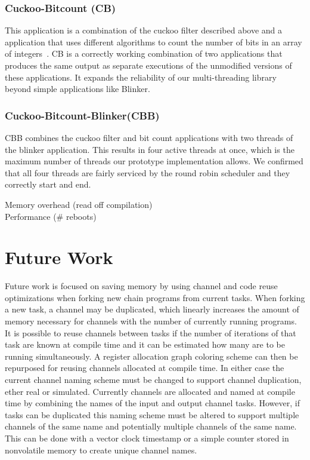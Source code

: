 \documentclass[11pt]{sensys-proc}
\begin{document}
\subsubsection{Cuckoo-Bitcount (CB)}
This application is a combination of the cuckoo filter described above and a
application that uses different algorithms to count the number of bits in an
array of integers~\cite{bitcount}. CB is a correctly working combination of two
applications that produces the same output as separate executions of the
unmodified versions of these applications. It expands the reliability of our
multi-threading library beyond simple applications like Blinker.
\subsubsection{Cuckoo-Bitcount-Blinker(CBB)}
CBB combines the cuckoo filter and bit count applications with two threads of
the blinker application. This results in four active threads at once, which is
the maximum number of threads our prototype implementation allows. We confirmed
that all four threads are fairly serviced by the round robin scheduler and they
correctly start and end. 


Memory overhead (read off compilation)\\
Performance (\# reboots)\\


\section{Future Work}
Future work is focused on saving memory by using channel and code reuse
optimizations when forking new chain programs from current tasks.  When forking
a new task, a channel may be duplicated, which linearly increases the amount of
memory necessary for channels with the number of currently running programs.  It
is possible to reuse channels between tasks if the number of iterations of that
task are known at compile time and it can be estimated how many are to be
running simultaneously. A register allocation graph coloring scheme can then be
repurposed for reusing channels allocated at compile time.  In either case the
current channel naming scheme must be changed to support channel duplication,
ether real or simulated.  Currently channels are allocated and named at compile
time by combining the names of the input and output channel tasks.  However, if
tasks can be duplicated this naming scheme must be altered to support multiple
channels of the same name and potentially multiple channels of the same name.
This can be done with a vector clock timestamp or a simple counter stored in
nonvolatile memory to create unique channel names.
\end{document}
